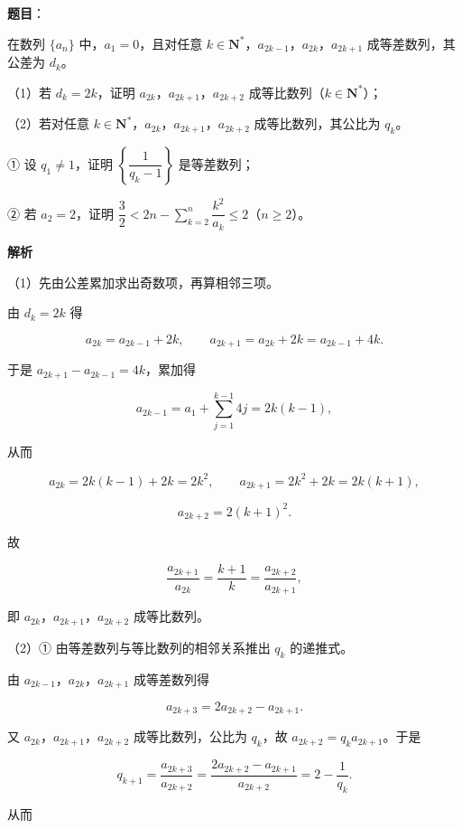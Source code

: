 \begin{answer}

\textbf{题目}：

在数列 $\{a_n\}$ 中，$a_1=0$，且对任意 $k\in\mathbf N^*$，$a_{2k-1}$，$a_{2k}$，$a_{2k+1}$ 成等差数列，其公差为 $d_k$。

（1）若 $d_k=2k$，证明 $a_{2k}$，$a_{2k+1}$，$a_{2k+2}$ 成等比数列（$k\in\mathbf N^*$）；

（2）若对任意 $k\in\mathbf N^*$，$a_{2k}$，$a_{2k+1}$，$a_{2k+2}$ 成等比数列，其公比为 $q_k$。

① 设 $q_1\neq1$，证明 $\left\{\dfrac1{q_k-1}\right\}$ 是等差数列；

② 若 $a_2=2$，证明 $\dfrac32<2n-\sum\limits_{k=2}^n\dfrac{k^2}{a_k}\leqslant2$（$n\geqslant2$）。

\textbf{解析}

（1）先由公差累加求出奇数项，再算相邻三项。

由 $d_k=2k$ 得

\nopagebreak[4]
\[a_{2k}=a_{2k-1}+2k,\qquad a_{2k+1}=a_{2k}+2k=a_{2k-1}+4k.\]

于是 $a_{2k+1}-a_{2k-1}=4k$，累加得

\nopagebreak[4]
\[a_{2k-1}=a_1+\sum_{j=1}^{k-1}4j=2k(k-1),\]

从而

\nopagebreak[4]
\[a_{2k}=2k(k-1)+2k=2k^2,\qquad
a_{2k+1}=2k^2+2k=2k(k+1),\]

\nopagebreak[4]
\[a_{2k+2}=2(k+1)^2.\]

故

\nopagebreak[4]
\[\frac{a_{2k+1}}{a_{2k}}=\frac{k+1}k=\frac{a_{2k+2}}{a_{2k+1}},\]

即 $a_{2k}$，$a_{2k+1}$，$a_{2k+2}$ 成等比数列。

（2）① 由等差数列与等比数列的相邻关系推出 $q_k$ 的递推式。

由 $a_{2k-1}$，$a_{2k}$，$a_{2k+1}$ 成等差数列得

\nopagebreak[4]
\[a_{2k+3}=2a_{2k+2}-a_{2k+1}.\]

又 $a_{2k}$，$a_{2k+1}$，$a_{2k+2}$ 成等比数列，公比为 $q_k$，故 $a_{2k+2}=q_ka_{2k+1}$。于是

\nopagebreak[4]
\[q_{k+1}=\frac{a_{2k+3}}{a_{2k+2}}
=\frac{2a_{2k+2}-a_{2k+1}}{a_{2k+2}}
=2-\frac1{q_k}.\]

从而


\end{answer}
